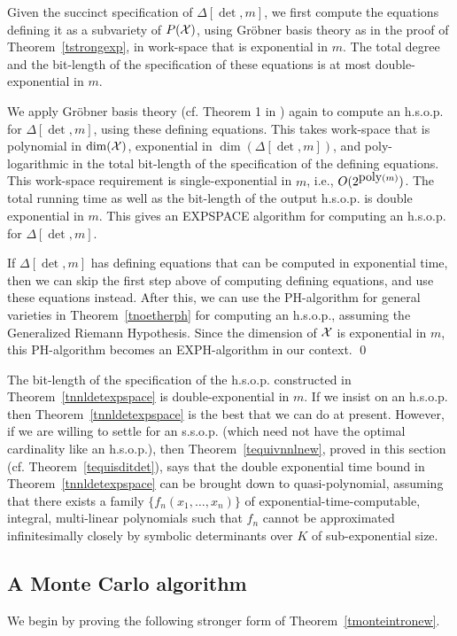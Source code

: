 \documentclass[11pt]{article}
\begin{document}
\proof Given the succinct specification of $\Delta[\det,m]$, we first compute the
equations defining it as a subvariety of
$P({\cal X})$,  using Gr\"obner basis theory as in the proof of Theorem~\ref{tstrongexp}, 
in  work-space that  is exponential in $m$.
The total degree and the bit-length of  the specification of these
equations is at most double-exponential in $m$.

We  apply Gr\"obner basis  theory (cf. Theorem 1 in \cite{mayr2}) again 
to compute an h.s.o.p. for $\Delta[\det,m]$, using these defining equations.
This takes work-space  that is polynomial in $\dim({\cal X})$, exponential in $\dim(\Delta[\det,m])$, and 
poly-logarithmic in the total bit-length of the specification of the defining equations.
This work-space requirement 
is single-exponential in $m$, i.e., $O(2^{{\mbox {poly}}(m)})$. The total running time as well as the bit-length of the output h.s.o.p.
is double exponential in $m$. 
This  gives 
an EXPSPACE algorithm for computing an h.s.o.p. for  $\Delta[\det,m]$. 


If $\Delta[\det,m]$ has  defining 
equations that can be computed in exponential time, then we 
can skip the first step above of computing defining equations, and use these equations instead. 
After this, we can use the PH-algorithm
for general varieties in Theorem~\ref{tnoetherph} for computing an h.s.o.p., assuming the Generalized Riemann Hypothesis. 
Since the dimension of ${\cal X}$ is exponential in $m$, this PH-algorithm 
becomes an EXPH-algorithm in our context.
\qed


The bit-length of the specification of the h.s.o.p. constructed in Theorem~\ref{tnnldetexpspace} is double-exponential in $m$.
If we insist on an h.s.o.p. then Theorem~\ref{tnnldetexpspace} is the best that we can do at present.
However, if we are willing to settle for an s.s.o.p. (which need not have the optimal cardinality like an h.s.o.p.),
then Theorem~\ref{tequivnnlnew}, proved in this section (cf. Theorem~\ref{tequisditdet}), 
says that the double exponential time bound in 
Theorem~\ref{tnnldetexpspace} can be brought down to quasi-polynomial,
assuming that there exists a family $\{f_n(x_1,\dots,x_n)\}$ 
of exponential-time-computable, integral, multi-linear polynomials such that $f_n$   cannot be 
approximated infinitesimally closely by symbolic determinants over $K$ of 
sub-exponential size.


\subsection{A Monte Carlo algorithm} \label{smontedet}
We begin by proving  the following  stronger form of Theorem~\ref{tmonteintronew}.
\end{document}
